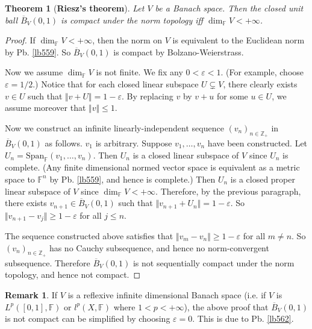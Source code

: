 \documentclass[12pt,b5paper,notitlepage]{article}
\theoremstyle{definition}
\newtheorem{rem}[df]{Remark}
\theoremstyle{plain}
\newtheorem{thm}[df]{Theorem}
\newcommand{\ovl}{\overline}
\newcommand{\Span}{\mathrm{Span}}
\newcommand{\Zbb}{\mathbb Z}
\newcommand{\Fbb}{\mathbb F}
\newcommand{\eps}{\varepsilon}
\numberwithin{equation}{section}
\begin{document}
\begin{thm}[\textbf{Riesz's theorem}]\label{lb565}
Let $V$ be a Banach space. Then the closed unit ball $\ovl B_V(0,1)$ is compact under the norm topology iff $\dim_\Fbb V<+\infty$.
\end{thm}

\begin{proof}
If $\dim_\Fbb V<+\infty$, then the norm on $V$ is equivalent to the Euclidean norm by Pb. \ref{lb559}. So $\ovl B_V(0,1)$ is compact by Bolzano-Weierstrass. 

Now we assume $\dim_\Fbb V$ is not finite. We fix any $0<\eps<1$. (For example, choose $\eps=1/2$.) Notice that for each closed linear subspace $U\subsetneq V$, there clearly exists $v\in U$ such that $\Vert v+U\Vert=1-\eps$. By replacing $v$ by $v+u$ for some $u\in U$, we assume moreover that $\Vert v\Vert\leq 1$.

Now we construct an infinite linearly-independent sequence $(v_n)_{n\in\Zbb_+}$ in $\ovl B_V(0,1)$ as follows. $v_1$ is arbitrary. Suppose $v_1,\dots,v_n$ have been constructed. Let $U_n=\Span_\Fbb(v_1,\dots,v_n)$. Then $U_n$ is a closed linear subspace of $V$ since $U_n$ is complete. (Any finite dimensional normed vector space is equivalent as a metric space to $\Fbb^n$ by Pb. \ref{lb559}, and hence is complete.) Then $U_n$ is a closed proper linear subspace of $V$ since $\dim_\Fbb V<+\infty$. Therefore, by the previous paragraph, there exists $v_{n+1}\in\ovl B_V(0,1)$ such that $\Vert v_{n+1}+U_n\Vert=1-\eps$. So $\Vert v_{n+1}-v_j\Vert\geq 1-\eps$ for all $j\leq n$.

The sequence constructed above satisfies that $\Vert v_m-v_n\Vert\geq 1-\eps$ for all $m\neq n$. So $(v_n)_{n\in\Zbb_+}$ has no Cauchy subsequence, and hence no norm-convergent subsequence. Therefore $\ovl B_V(0,1)$ is not sequentially compact under the norm topology, and hence not compact.
\end{proof}


\begin{rem}
If $V$ is a reflexive infinite dimensional Banach space (i.e. if $V$ is $L^p([0,1],\Fbb)$ or $l^p(X,\Fbb)$ where $1<p<+\infty$), the above proof that $\ovl B_V(0,1)$ is not compact can be simplified by choosing $\eps=0$. This is due to Pb. \ref{lb562}.
\end{rem}
\end{document}
